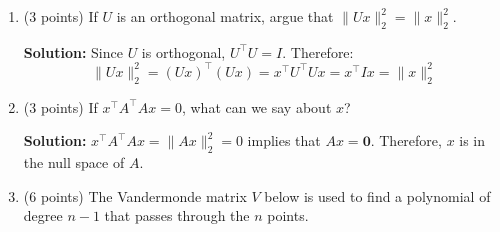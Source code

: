 \documentclass[12pt]{article}
\newcommand{\qspace}{\vspace{1em}} %
\newenvironment{solution}{\noindent\textbf{Solution:} }{\qspace}
\begin{document}
\begin{enumerate}
\begin{enumerate}
        \item (3 points) Let \( B \) be a real \( n \times n \) matrix. Argue why \( B^T B \) is diagonalizable and that all the eigenvalues of \( B^T B \) are nonnegative.
    
        \begin{solution}
        \( B^T B \) is symmetric because \( (B^T B)^T = B^T B \). All symmetric matrices are diagonalizable via an orthogonal transformation. Additionally, for any vector \( x \),
        \[
        x^\top B^T B x = (Bx)^\top (Bx) = \lVert Bx \rVert^2 \geq 0
        \]
        This shows that \( B^T B \) is positive semidefinite, and hence all its eigenvalues are nonnegative.
        \end{solution}
        
        \item (4 points) Prove that \( A^\top A + I \) is invertible for any matrix \( A \).
        
        \begin{solution}
        Consider the matrix \( A^\top A + I \). Since \( A^\top A \) is positive semidefinite, all its eigenvalues are nonnegative. Adding the identity matrix shifts all eigenvalues by 1, making them strictly positive. Therefore, \( A^\top A + I \) is positive definite and hence invertible.
        \end{solution}
    \end{enumerate}
    
    \item (3 points) If \( U \) is an orthogonal matrix, argue that \( \| Ux \|_2^2 = \| x \|_2^2 \).
    
    \begin{solution}
    Since \( U \) is orthogonal, \( U^\top U = I \). Therefore:
    \[
    \| Ux \|_2^2 = (Ux)^\top (Ux) = x^\top U^\top U x = x^\top I x = \| x \|_2^2
    \]
    \end{solution}
    
    \item (3 points) If \( x^\top A^\top A x = 0 \), what can we say about \( x \)?
    
        \begin{solution}
        \( x^\top A^\top A x = \| Ax \|_2^2 = 0 \) implies that \( Ax = \mathbf{0} \). Therefore, \( x \) is in the null space of \( A \).
        \end{solution}
    
    \item (6 points) The Vandermonde matrix $V$ below is used to find a polynomial of degree $n-1$ that passes through the $n$ points. 
    

\end{enumerate}
\end{document}
